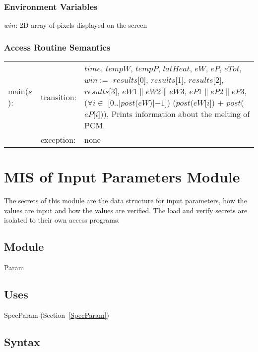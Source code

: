 \documentclass[12pt]{article}
\begin{document}
\subsubsection{Environment Variables}

$win$: 2D array of pixels displayed on the screen

\subsubsection{Access Routine Semantics}

\begin{tabular}{l l p{12cm}}
main($s$): & transition: & $time$, $tempW$, $tempP$, $latHeat$, $eW$, $eP$,
                           $eTot$, $win :=$ $results$[0], $results$[1],
                           $results$[2], $results$[3], $eW1 \| eW2 \| eW3$, $eP1
                           \| eP2 \| eP3$, ($\forall i \in$ [0..$|post$($eW$)$|
                           - 1$]) ($post$($eW$[$i$]) $+$ $post$($eP$[$i$])),
                           Prints information about the melting of PCM. \\
& exception: & none \\
\end{tabular}

\newpage
\section{MIS of Input Parameters Module} \label{Parameters}

The secrets of this module are the data structure for input parameters, how the
values are input and how the values are verified.  The load and verify secrets
are isolated to their own access programs.

\subsection{Module}

Param

\subsection{Uses}

SpecParam (Section~\ref{SpecParam})

\subsection{Syntax}
\end{document}
